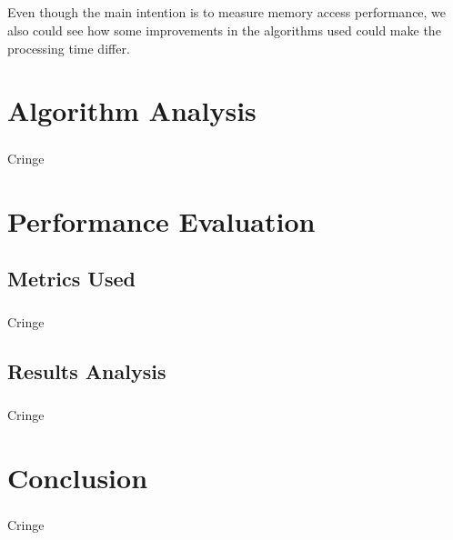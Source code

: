 \documentclass{report}
\begin{document}
    \paragraph{}Even though the main intention is to measure memory access performance, we also could see how some improvements in the algorithms used could make the processing time differ.

    \chapter{Algorithm Analysis}

    \paragraph{}Cringe

    \chapter{Performance Evaluation}

    \section{Metrics Used}

    \paragraph{}Cringe

    \section{Results Analysis}

    \paragraph{}Cringe

    \chapter{Conclusion}

    \paragraph{}Cringe
\end{document}
